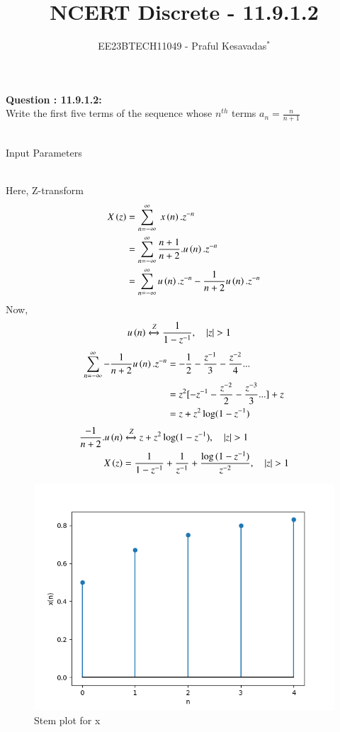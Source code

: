 \documentclass[journal,12pt,onecolumn]{IEEEtran}
\theoremstyle{remark}
\begin{document}

\vspace{3cm}

\title{NCERT Discrete - 11.9.1.2}
\author{EE23BTECH11049 - Praful Kesavadas$^{*}$%
}
\maketitle

\bigskip

\renewcommand{\thefigure}{\theenumi}
\renewcommand{\thetable}{\theenumi}

\textbf{Question : 11.9.1.2:}\\
Write the first five terms of the sequence whose $n^{th}$ terms  $a_n = \frac{n}{n+1}$\\
\solution\\
\begin{table}[ht!]
\centering

\caption{Input Parameters}
\end{table}\\
Here, Z-transform
\begin{align}
X\left(z\right) &= \sum_{n=-\infty}^\infty\ x\left(n\right).z^{-n}\\
&= \sum_{n=-\infty}^\infty \frac{n+1}{n+2}.u\left(n\right). z^{-n}\\
&= \sum_{n=-\infty}^\infty u\left(n\right).z^{-n} - \frac{1}{n+2} u\left(n\right).z^{-n}
\end{align}
Now, 
\begin{align}
u\brak{n} &\xleftrightarrow Z  \frac{1}{1-z^{-1}}, \quad{|z|>1}
\end{align}
\begin{align*}
\sum_{n=-\infty}^\infty - \frac{1}{n+2} u\left(n\right).z^{-n} &= -\frac{1}{2}-\frac{z^{-1}}{3}-\frac{z^{-2}}{4}...\\
&= z^2[-z^{-1}-\frac{z^{-2}}{2}-\frac{z^{-3}}{3}...]+z \\
&= z+ z^2\log(1-z^{-1})
\end{align*}
\begin{align}
\frac{-1}{n+2}.u\brak{n} &\xleftrightarrow Z  z+z^2\log(1-z^{-1}), \quad{|z|>1}\\
X\brak{z} &= \frac{1}{1-z^{-1}} + \frac{1}{z^{-1}}+\frac{\log{(1-z^{-1})}}{ z^{-2}} ,\quad{|z|>1}
\end{align}
\begin{figure}[ht!]
    \centering
    \includegraphics[width=\columnwidth]{figs/graph1.png}
    \caption{Stem plot for x}
    \label{fig:11.9.1.2fig1}
\end{figure}
\end{document}
